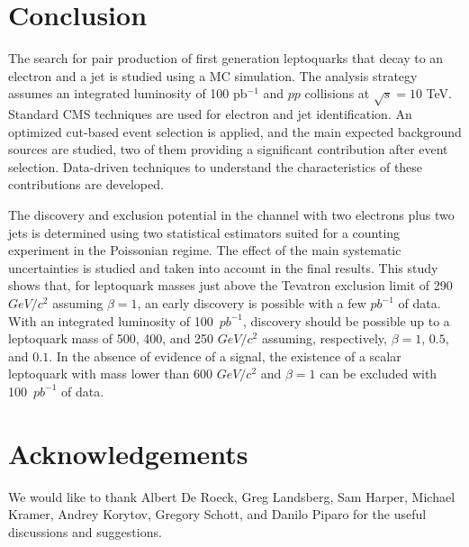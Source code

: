 \documentclass{cmspaper}
\begin{document}
\begin{linenumbers}
\section{Conclusion}

The search for pair production of first generation leptoquarks that decay to
an electron and a jet is studied using a MC simulation.
The analysis strategy 
assumes an integrated luminosity of 100 pb$^{-1}$ and $pp$ collisions 
at $\sqrt{s}=10$ TeV.
Standard CMS techniques are used for electron and jet identification. 
An optimized cut-based event selection is applied, and the main expected background 
sources are studied, two of them providing 
a significant contribution after event selection. 
Data-driven techniques to understand the characteristics of these contributions are developed.

The discovery and exclusion potential in the channel with two electrons plus two jets is
 determined using two statistical estimators suited for a counting experiment in the Poissonian regime.
The effect of the main systematic uncertainties 
is studied and taken into account in the final 
results. This study shows that, 
for leptoquark masses just above the Tevatron exclusion limit of 290~$GeV/c^2$
 assuming $\beta=1$, 
an early discovery is possible with a few $pb^{-1}$ of data.
With an integrated luminosity of 100~$pb^{-1}$, discovery should be possible up
to a leptoquark mass of 500, 400, and 250 $GeV/c^2$ assuming, respectively, 
$\beta=1$, $0.5$, and $0.1$. 
In the absence of evidence of a signal, the existence of a scalar leptoquark 
with mass lower than 600 $GeV/c^2$ 
and $\beta=1$ can be excluded with 100~$pb^{-1}$ of data.

\section{Acknowledgements}

We would like to thank Albert De Roeck, Greg Landsberg, Sam Harper,
Michael Kramer, Andrey Korytov, Gregory Schott, and Danilo Piparo for the useful discussions and suggestions.

%


\end{linenumbers}
\end{document}
